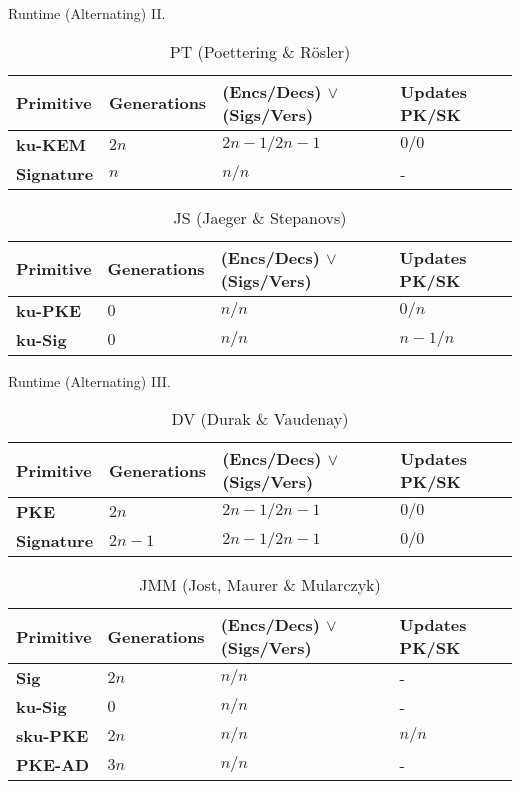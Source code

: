 \documentclass{beamer}
\begin{document}
\begin{frame}{Runtime (Alternating) II.}
  \scriptsize
  \begin{table}
    \caption*{PT (Poettering \& Rösler)}
    \begin{tabular}{ | l | l | l | l |}
      \hline
      Primitive & Generations & (Encs/Decs) $\vee$ (Sigs/Vers) & Updates PK/SK \\ \hline
      \textbf{ku-KEM} & $2n$ & $2n-1/2n-1$ & $0/0$ \\ \hline
      \textbf{Signature} & $n$ & $n/n$ & - \\  
        \hline
    \end{tabular}
  \end{table}
  \begin{table}
    \caption*{JS (Jaeger \& Stepanovs)}
    \begin{tabular}{ | l | l | l | l |}
    \hline
    Primitive & Generations & (Encs/Decs) $\vee$ (Sigs/Vers) & Updates PK/SK \\ \hline
    \textbf{ku-PKE} & $0$ & $n/n$ & $0/n$ \\ \hline
    \textbf{ku-Sig} & $0$ & $n/n$ & $n-1/n$ \\  
    \hline
    \end{tabular}
  \end{table}
\end{frame}

\begin{frame}{Runtime (Alternating) III.}
  \scriptsize
  \begin{table}
    \caption*{DV (Durak \& Vaudenay)}
    \begin{tabular}{ | l | l | l | l |}
    \hline
    Primitive & Generations & (Encs/Decs) $\vee$ (Sigs/Vers) & Updates PK/SK \\ \hline
    \textbf{PKE} & $2n$ & $2n-1/2n-1$ & $0/0$ \\ \hline
    \textbf{Signature} & $2n-1$ & $2n-1/2n-1$ & $0/0$ \\  
    \hline
    \end{tabular}
  \end{table}

  \begin{table}
    \caption*{JMM (Jost, Maurer \& Mularczyk)}
    \begin{tabular}{ | l | l | l | l |}
    \hline
    Primitive & Generations & (Encs/Decs) $\vee$ (Sigs/Vers) & Updates PK/SK \\ \hline
    \textbf{Sig} & $2n$ & $n/n$ & - \\ \hline
    \textbf{ku-Sig} & $0$ & $n/n$ & - \\ \hline
    \textbf{sku-PKE} & $2n$ & $n/n$ & $n/n$ \\ \hline
    \textbf{PKE-AD} & $3n$ & $n/n$ & - \\
    \hline
    \end{tabular}
  \end{table}
\end{frame}
\end{document}
